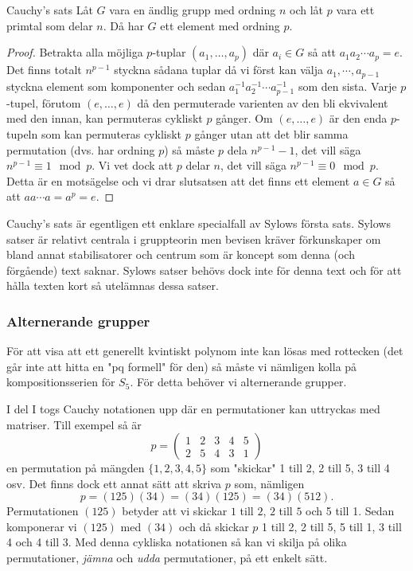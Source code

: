 \documentclass{article}
\theoremstyle{definition}
\begin{document}
\begin{mytheo}{Cauchy's sats}{}
  Låt $G$ vara en ändlig grupp med ordning $n$ och låt $p$ vara ett primtal som delar $n$. Då har $G$ ett element med ordning $p$. 
\end{mytheo}

\begin{proof}
  Betrakta alla möjliga $p$-tuplar $(a_1, \ldots, a_p)$ där $a_i \in G$ så att 
  $a_1 a_2 \cdots a_p = e$. Det finns totalt $n^{p-1}$ styckna sådana tuplar då vi först kan välja $a_1, \cdots, a_{p-1}$ styckna 
  element som komponenter och sedan $a_1^{-1} a_2^{-1} \cdots a_{p-1}^{-1}$ som den sista. Varje $p$-tupel, förutom $(e, \ldots, e)$ då 
  den permuterade varienten av den bli ekvivalent med den innan,
  kan permuteras cykliskt $p$ gånger. Om $(e, \ldots, e)$ är den enda $p$-tupeln som kan permuteras cykliskt $p$ gånger
  utan att det blir samma permutation (dvs. har ordning $p$) så måste 
  $p$ dela $n^{p-1} - 1$, det vill säga $n^{p-1} \equiv 1 \mod p$. Vi vet dock att $p$ delar $n$, det vill säga $n^{p-1} \equiv 0 \mod p$. 
  Detta är en motsägelse och vi drar slutsatsen att det finns ett element $a \in G$ så att $aa \cdots a = a^p = e$.
\end{proof}

Cauchy's sats är egentligen ett enklare specialfall av Sylows första sats. Sylows satser är relativt centrala i gruppteorin 
men bevisen kräver förkunskaper om bland annat stabilisatorer och centrum som är koncept som denna (och förgående) text saknar. 
Sylows satser behövs dock inte för denna text och för att hålla texten kort så utelämnas dessa satser. 
\subsubsection{Alternerande grupper}
För att visa att ett generellt kvintiskt polynom inte kan lösas med rottecken (det går inte att hitta en "pq formell" för den) så måste 
vi nämligen kolla på kompositionsserien för $S_5$. För detta behöver vi alternerande grupper. 

I del I togs Cauchy notationen upp där en permutationer kan uttryckas med matriser. Till exempel så är 
\[ p = 
\begin{pmatrix}
  1 & 2 &3 & 4 & 5 \\
  2 & 5 & 4 & 3 & 1
\end{pmatrix}
\]
en permutation på mängden $\{1, 2, 3, 4, 5\}$ som "skickar" 1 till 2, 2 till 5, 3 till 4 osv. Det finns dock ett annat sätt att skriva $p$ som, 
nämligen 
\[p = (125)(34) = (34)(125) = (34)(512).\]
Permutationen $(125)$ betyder att vi skickar $1$ till $2$, $2$ till $5$ och 5 till 1. Sedan komponerar vi $(125)$ med $(34)$
och då skickar $p$ 1 till 2, 2 till 5, 5 till 1, 3 till 4 och 4 till 3. 
Med denna cykliska notationen
så kan vi skilja på olika permutationer, \textit{jämna} och \textit{udda} permutationer, på ett enkelt sätt. 
\end{document}
